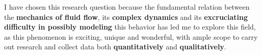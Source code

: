 {I have chosen this research question because the fundamental relation between the \textbf{mechanics of fluid flow}, its \textbf{complex dynamics} and its \textbf{excruciating difficulty in possibly modeling} this behavior has led me to explore this field, as this phenomenon is exciting, unique and wonderful, with ample scope to carry out research and collect data both \textbf{quantitatively} and \textbf{qualitatively}.}

